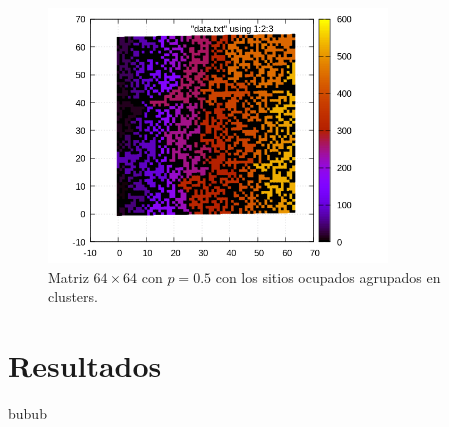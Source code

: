 \documentclass[10pt,twocolumn]{article}
\begin{document}
   \begin{figure}[H]
    \centering
    \includegraphics[width=9cm]{data/merged 64 0.5.png}
    \caption{Matriz $64\times 64$ con $p = 0.5$ con los sitios ocupados agrupados en clusters.}
    \label{merged 64 0.5} 
   \end{figure} 

\section{Resultados} 
   bubub
    
\end{document}
